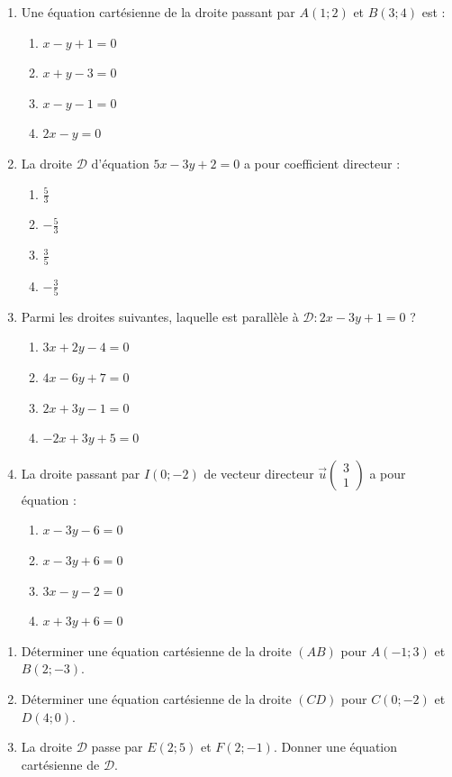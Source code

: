\documentclass[11pt]{article}
\begin{document}
\begin{exercice}
\begin{enumerate}
    \item Une équation cartésienne de la droite passant par $A(1;2)$ et $B(3;4)$ est :
    \begin{enumerate}
        \item $x-y+1=0$
        \item $x+y-3=0$
        \item $x-y-1=0$
        \item $2x-y=0$
    \end{enumerate}
    \item La droite $\mathcal{D}$ d'équation $5x-3y+2=0$ a pour coefficient directeur :
    \begin{enumerate}
        \item $\frac{5}{3}$
        \item $-\frac{5}{3}$
        \item $\frac{3}{5}$
        \item $-\frac{3}{5}$
    \end{enumerate}
    \item Parmi les droites suivantes, laquelle est parallèle à $\mathcal{D}: 2x-3y+1=0$ ?
    \begin{enumerate}
        \item $3x+2y-4=0$
        \item $4x-6y+7=0$
        \item $2x+3y-1=0$
        \item $-2x+3y+5=0$
    \end{enumerate}
    \item La droite passant par $I(0;-2)$ de vecteur directeur $\vec{u}\begin{pmatrix}3\\1\end{pmatrix}$ a pour équation :
    \begin{enumerate}
        \item $x-3y-6=0$
        \item $x-3y+6=0$
        \item $3x-y-2=0$
        \item $x+3y+6=0$
    \end{enumerate}
\end{enumerate}
\end{exercice}

\begin{exercice}
\begin{enumerate}
    \item Déterminer une équation cartésienne de la droite $(AB)$ pour $A(-1;3)$ et $B(2;-3)$.
    \item Déterminer une équation cartésienne de la droite $(CD)$ pour $C(0;-2)$ et $D(4;0)$.
    \item La droite $\mathcal{D}$ passe par $E(2;5)$ et $F(2;-1)$. Donner une équation cartésienne de $\mathcal{D}$.
\end{enumerate}
\end{exercice}
\end{document}
